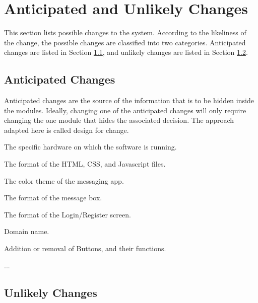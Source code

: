 \documentclass[12pt, titlepage]{article}
\newcounter{acnum}
\newcommand{\actheacnum}{AC\theacnum}
\begin{document}
\section{Anticipated and Unlikely Changes} \label{SecChange}

This section lists possible changes to the system. According to the likeliness
of the change, the possible changes are classified into two
categories. Anticipated changes are listed in Section \ref{SecAchange}, and
unlikely changes are listed in Section \ref{SecUchange}.

\subsection{Anticipated Changes} \label{SecAchange}

Anticipated changes are the source of the information that is to be hidden
inside the modules. Ideally, changing one of the anticipated changes will only
require changing the one module that hides the associated decision. The approach
adapted here is called design for
change.

\begin{description}
\item[ \actheacnum \label{acHardware}:] The specific hardware on which the software is running.
\item[ \actheacnum \label{acInput}:] The format of the HTML, CSS, and Javascript files.
\item[ \actheacnum \label{acInput}:] The color theme of the messaging app.
\item[ \actheacnum \label{acInput}:] The format of the message box.
\item[ \actheacnum \label{acInput}:] The format of the Login/Register screen.
\item[ \actheacnum \label{acInput}:] Domain name.
\item[ \actheacnum \label{acInput}:] Addition or removal of Buttons, and their functions.
\item[ \actheacnum \label{acInput}:] 
\item ...
\end{description}

\subsection{Unlikely Changes} \label{SecUchange}
\end{document}
